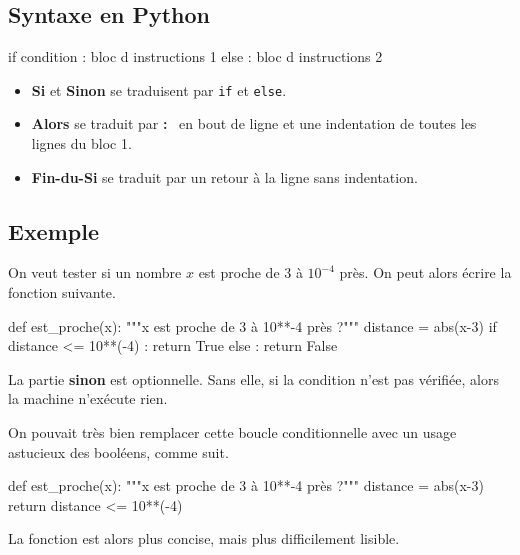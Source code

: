 \subsection{Syntaxe en Python}

\begin{pyverbatim}
if condition : 
	bloc d instructions 1
else :
	bloc d instructions 2
\end{pyverbatim}


 \begin{itemize}
 \item \textbf{Si} et \textbf{Sinon} se traduisent par \texttt{if} et \texttt{else}. 
 
 \item \textbf{Alors} se traduit par \og \textbf{:} \fg\ en bout de ligne et une indentation de toutes les 
lignes du bloc 1.
 
 \item \textbf{Fin-du-Si} se traduit par un retour à la ligne sans indentation. 
 
 \end{itemize}

 
\subsection{Exemple}

On veut tester si un nombre $x$ est proche de 3 à $10^{-4}$ près. On peut alors écrire la fonction suivante. 

\begin{pyverbatim}
def est_proche(x):
    """x est proche de 3 à 10**-4 près ?"""
    distance = abs(x-3)
    if distance <= 10**(-4) : 
        return True 
    else : 
        return False
\end{pyverbatim}



\begin{rem} 
La partie \textbf{sinon} est optionnelle. Sans elle, si la condition n'est pas vérifiée, alors la 
machine n'exécute rien.
\end{rem}

\begin{rem}
  On pouvait très bien remplacer cette boucle conditionnelle avec un usage astucieux des booléens, comme suit.
\begin{pyverbatim}
def est_proche(x):
    """x est proche de 3 à 10**-4 près ?"""
    distance = abs(x-3)
    return distance <= 10**(-4)
\end{pyverbatim}
La fonction est alors plus concise, mais plus difficilement lisible. 
\end{rem}


